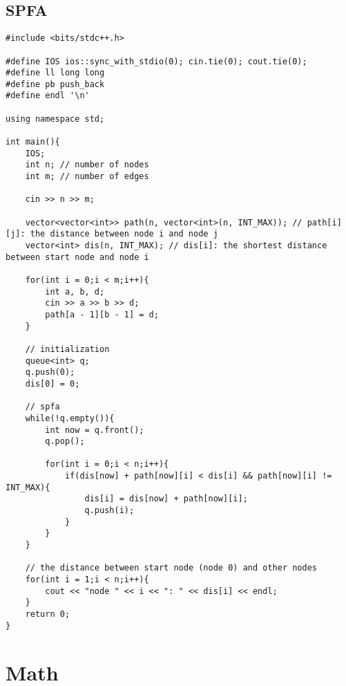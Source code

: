 \documentclass[12pt, a4paper]{article}
\begin{document}
\subsection{SPFA}
\begin{lstlisting}
#include <bits/stdc++.h>

#define IOS ios::sync_with_stdio(0); cin.tie(0); cout.tie(0);
#define ll long long
#define pb push_back
#define endl '\n'

using namespace std;

int main(){
    IOS;
    int n; // number of nodes
    int m; // number of edges

    cin >> n >> m;

    vector<vector<int>> path(n, vector<int>(n, INT_MAX)); // path[i][j]: the distance between node i and node j
    vector<int> dis(n, INT_MAX); // dis[i]: the shortest distance between start node and node i

    for(int i = 0;i < m;i++){
        int a, b, d;
        cin >> a >> b >> d;
        path[a - 1][b - 1] = d;
    }

    // initialization
    queue<int> q;
    q.push(0);
    dis[0] = 0;

    // spfa
    while(!q.empty()){
        int now = q.front();
        q.pop();

        for(int i = 0;i < n;i++){
            if(dis[now] + path[now][i] < dis[i] && path[now][i] != INT_MAX){
                dis[i] = dis[now] + path[now][i];
                q.push(i);
            }
        }
    }

    // the distance between start node (node 0) and other nodes
    for(int i = 1;i < n;i++){
        cout << "node " << i << ": " << dis[i] << endl;
    }
    return 0;
}
\end{lstlisting}

\section{Math}
\end{document}
